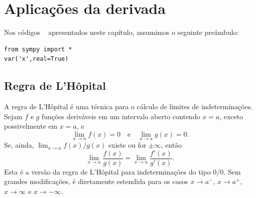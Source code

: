
\chapter{Aplicações da derivada}\label{cap_apderiv}
\thispagestyle{fancy}

\ifispython
\begin{obs}\label{obs:cap_apderiv_python}
  Nos códigos \sympy~ apresentados neste capítulo, assumimos o seguinte preâmbulo:
\begin{verbatim}
from sympy import *
var('x',real=True)
\end{verbatim}
\end{obs}
\fi

\section{Regra de L'Hôpital}\label{cap_apderiv_sec_lhospital}

A regra de L'Hôpital é uma técnica para o cálculo de limites de indeterminações. Sejam $f$ e $g$ funções deriváveis em um intervalo aberto contendo $x=a$, exceto possivelmente em $x=a$, e
\begin{equation}
  \lim_{x\to a} f(x) = 0\quad\text{e}\quad\lim_{x\to a} g(x) = 0.
\end{equation}
Se, ainda, $\lim_{x\to a} f(x)/g(x)$ existe ou for $\pm\infty$, então
\begin{equation}
  \lim_{x\to a} \frac{f(x)}{g(x)} = \lim_{x\to a} \frac{f'(x)}{g'(x)}.
\end{equation}
Esta é a versão da regra de L'Hôpital para indeterminações do tipo $0/0$. Sem grandes modificações, é diretamente estendida para os casos $x\to a^-$, $x\to a^+$, $x\to \infty$ e $x\to -\infty$.

